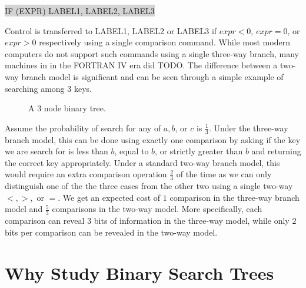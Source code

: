 \documentclass[letterpaper,12pt,titlepage,oneside,final]{book}
\theoremstyle{plain}
\begin{document}
\colorbox{lightgrey}{ \selectfont \uppercase{IF (expr) label1, label2, label3} } 
 
\noindent Control is transferred to \uppercase{label1}, \uppercase{label2} or \uppercase{label3} if $expr < 0$, $expr=0$, or $expr > 0$ respectively using a single comparison command. While most modern computers do not support such commands using a single three-way branch, many machines in in the FORTRAN IV era did \cite{} TODO. The difference between a two-way branch model is significant and can be seen through a simple example of searching among 3 keys.

\begin{figure}[!ht]
\begin{center}

\caption{A 3 node binary tree.}

\end{center}
\end{figure}

Assume the probability of search for any of $a,b$, or $c$ is $\frac{1}{3}$. Under the three-way branch model, this can be done using exactly one comparison by asking if the key we are search for is less than $b$, equal to $b$, or strictly greater than $b$ and returning the correct key appropriately. Under a standard two-way branch model, this would require an extra comparison operation $\frac{2}{3}$ of the time as we can only distinguish one of the the three cases from the other two using a single two-way $<, >,$ or $=$. We get an expected cost of $1$ comparison in the three-way branch model and $\frac{5}{3}$ comparisons in the two-way model. More specifically, each comparison can reveal $3$ bits of information in the three-way model, while only $2$ bits per comparison can be revealed in the two-way model. 

\section{Why Study Binary Search Trees}
\end{document}
